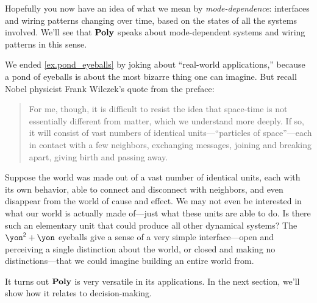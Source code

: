 \documentclass[Book-Poly]{subfiles}
\begin{document}
Hopefully you now have an idea of what we mean by \emph{mode-dependence}: interfaces and wiring patterns changing over time, based on the states of all the systems involved. We'll see that $\mathbf{Poly}$ speaks about mode-dependent systems and wiring patterns in this sense. 

\begin{remark}
We ended \cref{ex.pond_eyeballs} by joking about ``real-world applications,'' because a pond of eyeballs is about the most bizarre thing one can imagine. But recall Nobel physicist Frank Wilczek's quote from the preface:
\begin{quote}
For me, though, it is difficult to resist the idea that space-time is not essentially different from matter, which we understand more deeply. If so, it will consist of vast numbers of identical units---``particles of space''---each in contact with a few neighbors, exchanging messages, joining and breaking apart, giving birth and passing away.
\end{quote}
Suppose the world was made out of a vast number of identical units, each with its own behavior, able to connect and disconnect with neighbors, and even disappear from the world of cause and effect. We may not even be interested in what our world is actually made of---just what these units are able to do. Is there such an elementary unit that could produce all other dynamical systems? The $\yon^\2+\yon$ eyeballs give a sense of a very simple interface---open and perceiving a single distinction about the world, or closed and making no distinctions---that we could imagine building an entire world from.
\end{remark}

It turns out $\mathbf{Poly}$ is very versatile in its applications. In the next section, we'll show how it relates to decision-making.

\end{document}
